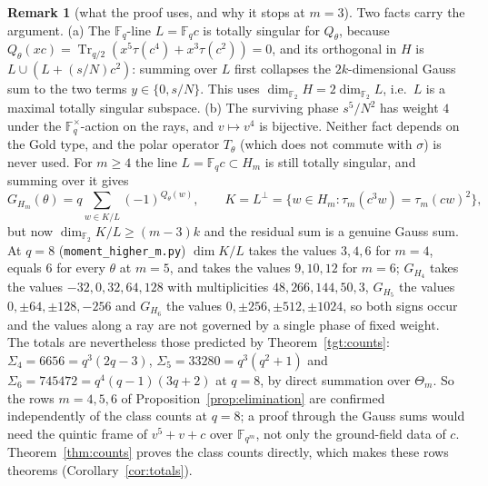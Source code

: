 \documentclass[12pt,a4paper]{amsart}
\theoremstyle{definition}
\newtheorem{remark}[theorem]{Remark}
\newcommand{\F}{\mathbb{F}}
\newcommand{\Tr}{\operatorname{Tr}}
\begin{document}
\begin{remark}[what the proof uses, and why it stops at $m=3$]\label{rem:m3special}
Two facts carry the argument. (a) The $\F_q$-line $L=\F_qc$ is totally singular for $Q_\theta$, because $Q_\theta(xc)=\Tr_{q/2}(x^5\tau(c^4)+x^3\tau(c^2))=0$, and its orthogonal in $H$ is $L\cup(L+(s/N)c^2)$: summing over $L$ first collapses the $2k$-dimensional Gauss sum to the two terms $y\in\{0,s/N\}$. This uses $\dim_{\F_2}H=2\dim_{\F_2}L$, i.e.\ $L$ is a maximal totally singular subspace. (b) The surviving phase $s^5/N^2$ has weight $4$ under the $\F_q^\times$-action on the rays, and $v\mapsto v^4$ is bijective. Neither fact depends on the Gold type, and the polar operator $T_\theta$ (which does not commute with $\sigma$) is never used. For $m\ge4$ the line $L=\F_qc\subset H_m$ is still totally singular, and summing over it gives
\[
G_{H_m}(\theta)=q\sum_{w\in K/L}(-1)^{Q_\theta(w)},\qquad K=L^\perp=\{w\in H_m:\tau_m(c^3w)=\tau_m(cw)^2\},
\]
but now $\dim_{\F_2}K/L\ge(m-3)k$ and the residual sum is a genuine Gauss sum. At $q=8$ (\texttt{moment\_higher\_m.py}) $\dim K/L$ takes the values $3,4,6$ for $m=4$, equals $6$ for every $\theta$ at $m=5$, and takes the values $9,10,12$ for $m=6$; $G_{H_4}$ takes the values $-32,0,32,64,128$ with multiplicities $48,266,144,50,3$, $G_{H_5}$ the values $0,\pm64,\pm128,-256$ and $G_{H_6}$ the values $0,\pm256,\pm512,\pm1024$, so both signs occur and the values along a ray are not governed by a single phase of fixed weight. The totals are nevertheless those predicted by Theorem~\ref{tgt:counts}: $\Sigma_4=6656=q^3(2q-3)$, $\Sigma_5=33280=q^3(q^2+1)$ and $\Sigma_6=745472=q^4(q-1)(3q+2)$ at $q=8$, by direct summation over $\Theta_m$. So the rows $m=4,5,6$ of Proposition~\ref{prop:elimination} are confirmed independently of the class counts at $q=8$; a proof through the Gauss sums would need the quintic frame of $v^5+v+c$ over $\F_{q^m}$, not only the ground-field data of $c$. Theorem~\ref{thm:counts} proves the class counts directly, which makes these rows theorems (Corollary~\ref{cor:totals}).
\end{remark}
\end{document}
